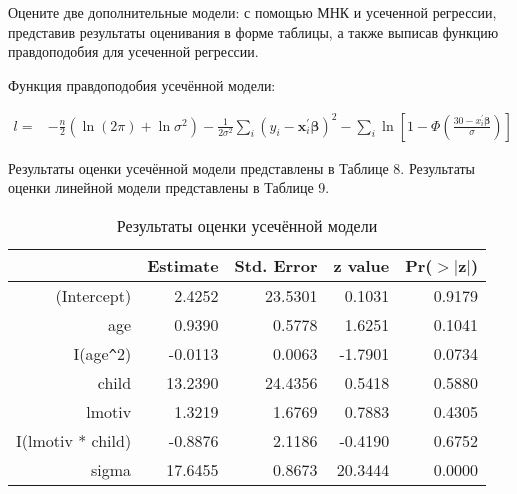 \documentclass[a4paper,12pt]{article}
\begin{document}
\section{}

\subsection{}

\Sun Оцените две дополнительные модели: с помощью МНК и усеченной регрессии,
представив результаты оценивания в форме таблицы, а также выписав функцию
правдоподобия для усеченной регрессии.


Функция правдоподобия усечённой модели:

\[
\begin{aligned} l=&-\frac{n}{2}\left(\ln (2 \pi)+\ln \sigma^{2}\right)-\frac{1}{2 \sigma^{2}} \sum_{i}\left(y_{i}-\boldsymbol{x}_{i}^{\prime} \boldsymbol{\beta}\right)^{2} -\sum_{i} \ln \left[1-\Phi\left(\frac{30-x_{i}^{\prime} \boldsymbol{\beta}}{\sigma}\right)\right] \end{aligned}
\]

Результаты оценки усечённой модели представлены в Таблице 8. Результаты оценки линейной модели представлены в Таблице 9.

\begin{table}[ht]
	\centering
	\begin{tabular}{|rrrrr|}
		\hline
		& Estimate & Std. Error & z value & Pr($>$$|$z$|$) \\ 
		\hline
		(Intercept) & 2.4252 & 23.5301 & 0.1031 & 0.9179 \\ 
		age & 0.9390 & 0.5778 & 1.6251 & 0.1041 \\ 
		I(age\verb|^|2) & -0.0113 & 0.0063 & -1.7901 & 0.0734 \\ 
		child & 13.2390 & 24.4356 & 0.5418 & 0.5880 \\ 
		lmotiv & 1.3219 & 1.6769 & 0.7883 & 0.4305 \\ 
		I(lmotiv * child) & -0.8876 & 2.1186 & -0.4190 & 0.6752 \\ 
		sigma & 17.6455 & 0.8673 & 20.3444 & 0.0000 \\ 
		\hline
	\end{tabular}
\caption{Результаты оценки усечённой модели}
\end{table}
\end{document}
